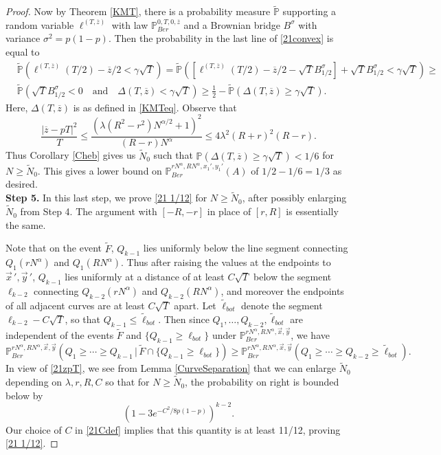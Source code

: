 \begin{proof}
		Now by Theorem \ref{KMT}, there is a probability measure $\tilde{\mathbb{P}}$ supporting a random variable $\ell^{(T,\overline{z})}$ with law $\mathbb{P}^{0,T,0,\overline{z}}_{Ber}$ and a Brownian bridge $B^\sigma$ with variance $\sigma^2 = p(1-p)$. Then the probability in the last line of \eqref{21convex} is equal to
		\begin{align*}
		& \tilde{\mathbb{P}}\left( \ell^{(T,\overline{z})}(T/2) - \overline{z}/2 < \gamma\sqrt{T}\right) = \tilde{\mathbb{P}}\left(\left[\ell^{(T,\overline{z})}(T/2) - \overline{z}/2 - \sqrt{T}B^\sigma_{1/2}\right] + \sqrt{T}B^\sigma_{1/2} < \gamma\sqrt{T}\right) \geq \\
		& \tilde{\mathbb{P}}\left(\sqrt{T}B^\sigma_{1/2} < 0\quad\mathrm{and}\quad \Delta(T,\overline{z}) < \gamma\sqrt{T}\right) \geq \frac{1}{2} - \tilde{\mathbb{P}}\left(\Delta(T,\overline{z}) \geq \gamma\sqrt{T}\right).
		\end{align*}
		Here, $\Delta(T,\overline{z})$ is as defined in \eqref{KMTeq}. Observe that
		\begin{equation}\label{21zpT}
		\frac{|\overline{z} - pT|^2}{T} \leq \frac{(\lambda(R^2-r^2) N^{\alpha/2} + 1)^2}{(R-r)N^\alpha} \leq 4\lambda^2(R+r)^2(R-r).
		\end{equation}
		Thus Corollary \ref{Cheb} gives us $\tilde{N}_0$ such that $\mathbb{P}(\Delta(T,\overline{z})\geq \gamma\sqrt{T})<1/6$ for $N\geq \tilde{N}_0$. This gives a lower bound on $\mathbb{P}^{rN^\alpha, RN^\alpha,x_1',y_1'}_{Ber} (A)$ of $1/2 - 1/6 = 1/3$ as desired.\\
		
		\noindent\textbf{Step 5.} In this last step, we prove \eqref{21 1/12} for $N\geq \tilde{N}_0$, after possibly enlarging $\tilde{N}_0$ from Step 4. The argument with $[-R,-r]$ in place of $[r,R]$ is essentially the same. 
		
		Note that on the event $\tilde F$, $Q_{k-1}$ lies uniformly below the line segment connecting $Q_1(rN^\alpha)$ and $Q_1(RN^\alpha)$. Thus after raising the values at the endpoints to $\vec{x}\,',\vec{y}\,'$, $Q_{k-1}$ lies uniformly at a distance of at least $C\sqrt{T}$ below the segment $\ell_{k-2}$ connecting $Q_{k-2}(rN^\alpha)$ and $Q_{k-2}(RN^\alpha)$, and moreover the endpoints of all adjacent curves are at least $C\sqrt{T}$ apart. Let $\tilde{\ell}_{bot}$ denote the segment $\ell_{k-2} - C\sqrt{T}$, so that $Q_{k-1} \leq \tilde\ell_{bot}$. Then since $Q_1,\dots,Q_{k-2},\tilde \ell_{bot}$ are independent of the events $\tilde F$ and $\{Q_{k-1} \geq \ell_{bot}\}$ under $\mathbb{P}^{rN^\alpha, RN^\alpha,\vec{x},\vec{y}}_{Ber}$, we have 
		\[
		\mathbb{P}^{rN^\alpha, RN^\alpha,\vec{x},\vec{y}}_{Ber} \left(Q_1 \geq \cdots \geq Q_{k-1}\,\big|\,\tilde F\cap \{ Q_{k-1} \geq \ell_{bot}\}\right) \geq \mathbb{P}^{rN^\alpha, RN^\alpha,\vec{x},\vec{y}}_{Ber} \left(Q_1 \geq \cdots \geq Q_{k-2} \geq \tilde \ell_{bot}\right).
		\]
		In view of \eqref{21zpT}, we see from Lemma \ref{CurveSeparation} that we can enlarge $\tilde{N}_0$ depending on $\lambda, r, R, C$ so that for $N\geq\tilde{N}_0$, the probability on right is bounded below by
		\[
		\left(1-3e^{-C^2/8p(1-p)}\right)^{k-2}.
		\]
		Our choice of $C$ in \eqref{21Cdef} implies that this quantity is at least 11/12, proving \eqref{21 1/12}.
		

\end{proof}
